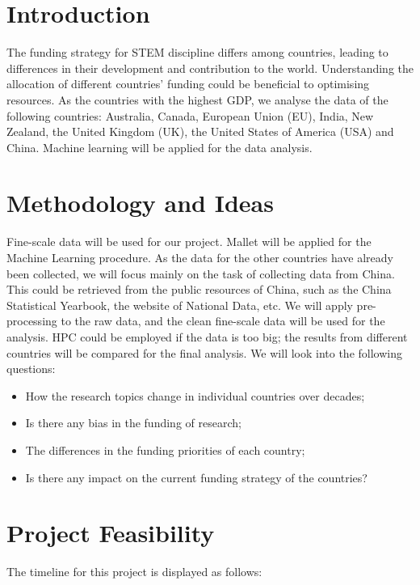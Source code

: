 \documentclass[11pt, oneside]{article}   	%
\begin{document}
\section{Introduction}

The funding strategy for STEM discipline differs among countries, leading to differences in their development and contribution to the world. Understanding the allocation of different countries' funding could be beneficial to optimising resources. As the countries with the highest GDP, we analyse the data of the following countries: Australia, Canada, European Union (EU), India, New Zealand, the United Kingdom (UK), the United States of America (USA) and China. Machine learning will be applied for the data analysis. 

\section{Methodology and Ideas}
Fine-scale data will be used for our project. Mallet will be applied for the Machine Learning procedure. As the data for the other countries have already been collected, we will focus mainly on the task of collecting data from China. This could be retrieved from the public resources of China, such as the China Statistical Yearbook, the website of National Data, etc. We will apply pre-processing to the raw data, and the clean fine-scale data will be used for the analysis. HPC could be employed if the data is too big; the results from different countries will be compared for the final analysis.
\bigbreak
\noindent We will look into the following questions:
\begin{itemize}
\item How the research topics change in individual countries over decades; 
\item Is there any bias in the funding of research;
\item The differences in the funding priorities of each country;
\item Is there any impact on the current funding strategy of the countries?
\end{itemize}

\section{Project Feasibility}

The timeline for this project is displayed as follows:
\end{document}
